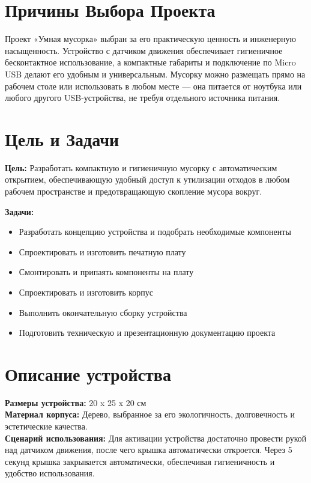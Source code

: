 \documentclass[a4paper, 12pt]{article} %
\begin{document}
\section{Причины Выбора Проекта}

Проект «Умная мусорка» выбран за его практическую ценность и инженерную насыщенность. Устройство с датчиком движения обеспечивает гигиеничное бесконтактное использование, а компактные габариты и подключение по Micro USB делают его удобным и универсальным. Мусорку можно размещать прямо на рабочем столе или использовать в любом месте — она питается от ноутбука или любого другого USB-устройства, не требуя отдельного источника питания.

\section{Цель и Задачи}

\noindent\textbf{Цель:} Разработать компактную и гигиеничную мусорку с автоматическим открытием, обеспечивающую удобный доступ к утилизации отходов в любом рабочем пространстве и предотвращающую скопление мусора вокруг.

\noindent\textbf{Задачи:}
\begin{itemize}
    \item Разработать концепцию устройства и подобрать необходимые компоненты
    \item Спроектировать и изготовить печатную плату
    \item Смонтировать и припаять компоненты на плату
    \item Спроектировать и изготовить корпус
    \item Выполнить окончательную сборку устройства
    \item Подготовить техническую и презентационную документацию проекта
\end{itemize}

\section{Описание устройства}

\noindent\textbf{Размеры устройства:} 20 x 25 x 20 см \\
\noindent\textbf{Материал корпуса:} Дерево, выбранное за его экологичность, долговечность и эстетические качества. \\
\noindent\textbf{Сценарий использования:} Для активации устройства достаточно провести рукой над датчиком движения, после чего крышка автоматически откроется. Через 5 секунд крышка закрывается автоматически, обеспечивая гигиеничность и удобство использования.
\end{document}
